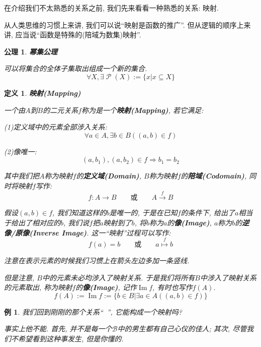 \documentclass[UTF8]{ctexart}
\newcommand{\<}{\langle}
\renewcommand{\>}{\rangle}
\DeclareMathOperator{\PP}{\mathcal{P}}
\DeclareMathOperator{\Image}{Im}
\DeclareMathOperator{\like}{\overset{\heartsuit}{\leadsto}}
\newtheorem{dfn}[thm]{定义}
\newtheorem{xmp}{例}[subsection]
\newtheorem{axm}{公理}
\begin{document}
            在介绍我们不太熟悉的关系之前, 我们先来看看一种熟悉的关系: 映射. 

            从人类思维的习惯上来讲, 我们可以说``映射是函数的推广''. 但从逻辑的顺序上来讲, 应当说``函数是特殊的(陪域为数集)映射''. 
            
            \begin{axm}
                \textbf{幂集公理}
        
                可以将集合的全体子集取出组成一个新的集合. 
                \[\forall X, \exists\PP(X):=\{x|x\subseteq X\}\]
            \end{axm}
            
            \begin{dfn}
                \textbf{映射(Mapping)}

                一个由$A$到$B$的二元关系$f$称为是一个\textbf{映射(Mapping)}, 若它满足: 

                (1)定义域中的元素全部涉入关系: 
                \[\forall a\in A, \exists b\in B((a,b)\in f)\]

                (2)像唯一: 
                \[(a,b_1),(a,b_2)\in f\Longrightarrow b_1=b_2\]

                其中我们把$A$称为映射$f$的\textbf{定义域(Domain)}, $B$称为映射$f$的\textbf{陪域(Codomain)}, 同时将映射$f$写作: 
                \[f:A\to B\qquad\text{或}\qquad A\overset{f}{\longrightarrow} B\]

                假设$(a,b)\in f$, 我们知道这样的$b$是唯一的, 于是在已知$f$的条件下, 给出了$a$相当于给出了相对应的$b$, 我们说$f$把$a$映射到了$b$, 将$b$称为$a$的\textbf{像(Image)}, $a$称为$b$的\textbf{逆像/原像(Inverse Image)}. 这一``映射''过程可以写作: 
                \[f(a)=b\qquad\text{或}\qquad a\overset{f}{\mapsto} b\]

                注意在表示元素的时候我们习惯上在箭头左边多加一条竖线. 

                但是注意, $B$中的元素未必均涉入了映射关系. 于是我们将所有$B$中涉入了映射关系的元素取出, 称为映射$f$的\textbf{像(Image)}, 记作$\Image f$, 有时也写作$f(A)$. 
                \[f(A):=\Image f:=\{b\in B|\exists a\in A((a,b)\in f)\}\]
            \end{dfn}
            
            \begin{xmp}
                我们回到刚刚的那个关系``$\like$'', 它能构成一个映射吗? 

                事实上他不能. 首先, 并不是每一个$\mathcal{B}$中的男生都有自己心仪的佳人; 其次, 尽管我们不希望看到这种事发生, 但是你懂的. 
            \end{xmp}
\end{document}
